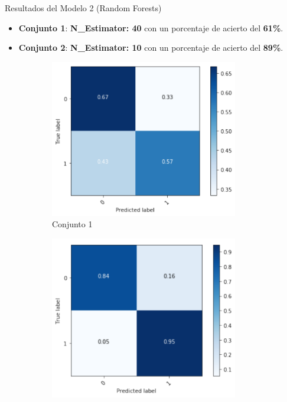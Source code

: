 \documentclass[10pt]{beamer}
\begin{document}
\begin{frame}{Resultados del Modelo 2 (Random Forests)}
  \begin{itemize}
  	\item \textbf{Conjunto 1}: \textbf{N\_Estimator: 40} con un porcentaje de acierto del \textbf{61\%}.
  	\item \textbf{Conjunto 2}: \textbf{N\_Estimator: 10} con un porcentaje de acierto del \textbf{89\%}.
  \end{itemize}
  \begin{figure}[!htb]
    \begin{subfigure}[b]{0.45\linewidth}
    	\centering
	    \includegraphics[width=0.9\textwidth]{images/resultados_rf_cm_conjunto1.png}
	    \caption{Conjunto 1}
	\end{subfigure}
	\begin{subfigure}[b]{0.45\linewidth} 
		\centering
		\includegraphics[width=0.9\textwidth]{images/resultados_rf_cm_conjunto2.png}

\end{subfigure}
\end{figure}
\end{frame}
\end{document}

